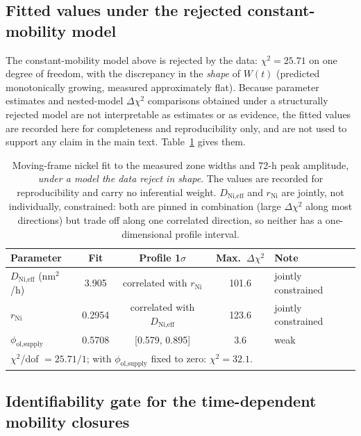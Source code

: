 \subsection{Fitted values under the rejected constant-mobility model}
\label{sec:ni-fit}

The constant-mobility model above is rejected by the data:
$\chi^2 = 25.71$ on one degree of freedom, with the discrepancy in the
\emph{shape} of $W(t)$ (predicted monotonically growing, measured
approximately flat). Because parameter estimates and nested-model
$\Delta\chi^2$ comparisons obtained under a structurally rejected model
are not interpretable as estimates or as evidence, the fitted values are
recorded here for completeness and reproducibility only, and are not used
to support any claim in the main text. Table~\ref{tab:ni-fit} gives them.

\begin{table}[htbp]
\centering
\caption{Moving-frame nickel fit to the measured zone widths and 72-h
peak amplitude, \emph{under a model the data reject in shape}. The values
are recorded for reproducibility and carry no inferential weight.
$D_\text{Ni,eff}$ and $r_\text{Ni}$ are jointly, not individually,
constrained: both are pinned in combination (large $\Delta\chi^2$ along
most directions) but trade off along one correlated direction, so
neither has a one-dimensional profile interval.}
\label{tab:ni-fit}
\begin{tabular}{lcccl}
\toprule
Parameter & Fit & Profile 1$\sigma$ & Max.\ $\Delta\chi^2$ & Note \\
\midrule
$D_\text{Ni,eff}$ (nm$^2$/h) & 3.905 & correlated with $r_\text{Ni}$ & 101.6 & jointly constrained \\
$r_\text{Ni}$ & 0.2954 & correlated with $D_\text{Ni,eff}$ & 123.6 & jointly constrained \\
$\phi_\text{ol,supply}$ & 0.5708 & [0.579, 0.895] & 3.6 & weak \\
\multicolumn{5}{l}{$\chi^2$/dof $= 25.71/1$; with $\phi_\text{ol,supply}$ fixed to zero: $\chi^2 = 32.1$.} \\
\bottomrule
\end{tabular}
\end{table}

\subsection{Identifiability gate for the time-dependent mobility closures}
\label{sec:ni-closures}

